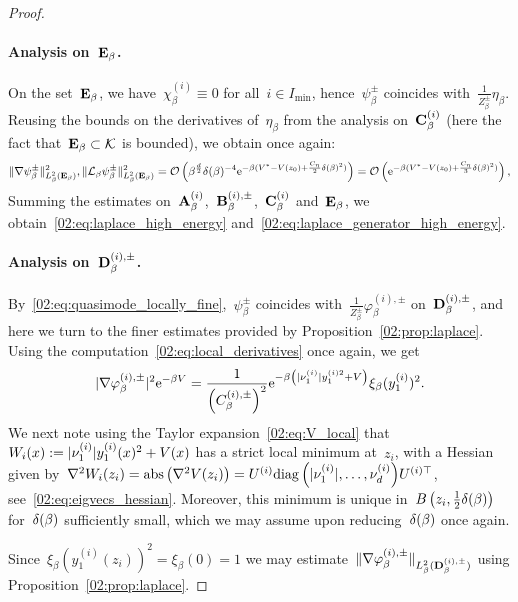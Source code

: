 \begin{proof}
            \paragraph{Analysis on~$\mathbf{E}_\beta$.\newline}
            On the set~$\mathbf{E}_\beta$, we have~$\chi_\beta^{(i)}\equiv 0$ for all~$i\in I_{\min}$, hence~$\psi_\beta^\pm$ coincides with~$\frac1{Z_\beta^{\pm}}\eta_\beta$. Reusing the bounds on the derivatives of~$\eta_\beta$ from the analysis on~$\mathbf{C}_\beta^{(i)}$ (here the fact that~$\mathbf{E}_\beta\subset\mathcal K$ is bounded), we obtain once again:
            \[\|\nabla\psi_\beta^\pm\|^2_{L_\beta^2(\mathbf{E}_\beta)},\|\mathcal{L}_\beta\psi_\beta^\pm\|^2_{L_\beta^2(\mathbf{E}_\beta)} = \mathcal{O}\left(\beta^{\frac d2}\delta(\beta)^{-4}\mathrm{e}^{-\beta(V^*-V(z_0)+\frac{C_\eta}2\delta(\beta)^2)}\right)=\mathcal{O}\left(\mathrm{e}^{-\beta(V^*-V(z_0)+\frac{C_\eta}3\delta(\beta)^2)}\right),\]
            Summing the estimates on~$\mathbf{A}_\beta^{(i)}$,~$\mathbf{B}_\beta^{(i),\pm}$,~$\mathbf{C}_\beta^{(i)}$ and~$\mathbf{E}_\beta$, we obtain~\eqref{02:eq:laplace_high_energy} and~\eqref{02:eq:laplace_generator_high_energy}.            
            \paragraph{Analysis on~$\mathbf{D}_\beta^{(i),\pm}$.\newline}
            By~\eqref{02:eq:quasimode_locally_fine},~$\psi_\beta^\pm$ coincides with~$\frac1{Z_\beta^{\pm}}\varphi_\beta^{(i),\pm}$ on~$\mathbf{D}_\beta^{(i),\pm}$, and here we turn to the finer estimates provided by Proposition~\ref{02:prop:laplace}.
            Using the computation~\eqref{02:eq:local_derivatives} once again, we get
            \[|\nabla\varphi_\beta^{(i),\pm}|^2\mathrm{e}^{-\beta V}= \frac1{\left(C_\beta^{(i),\pm}\right)^2}\mathrm{e}^{-\beta\left(|\nu^{(i)}_{1}|y^{(i)2}_1+ V\right)}\xi_\beta(y_1^{(i)})^2.\]
            We next note using the Taylor expansion~\eqref{02:eq:V_local} that $W_i(x):=|\nu^{(i)}_{1}|y^{(i)}_1(x)^2+ V(x)$ has a strict local minimum at~$z_i$, with a Hessian given by~${\nabla^2 W_i(z_i) = \mathrm{abs}\left(\nabla^2 V(z_i)\right) = U^{(i)}\mathrm{diag}\left(|\nu^{(i)}_{1}|,\dots, \nu^{(i)}_{d}\right)}U^{(i)\top}$, see~\eqref{02:eq:eigvecs_hessian}. Moreover, this minimum is unique in~$B\left(z_i,\frac12\delta(\beta)\right)$ for~$\delta(\beta)$ sufficiently small, which we may assume upon reducing~$\delta(\beta)$ once again.

            Since~$\xi_\beta(y_1^{(i)}(z_i))^2=\xi_\beta(0)=1$ we may estimate~$\|\nabla \varphi_\beta^{(i),\pm}\|_{L_\beta^2(\mathbf{D}_\beta^{(i),\pm})}$ using Proposition~\ref{02:prop:laplace}.


\end{proof}
